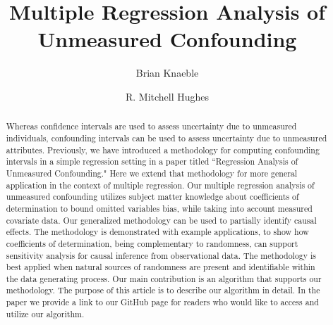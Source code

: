 \documentclass[11pt]{amsart}
\title{Multiple Regression Analysis of Unmeasured Confounding}
\author{Brian Knaeble}
\author{R. Mitchell Hughes}
\begin{document}
\begin{abstract}
Whereas confidence intervals are used to assess uncertainty due to unmeasured individuals, confounding intervals can be used to assess uncertainty due to unmeasured attributes. Previously, we have introduced a methodology for computing confounding intervals in a simple regression setting in a paper titled ``Regression Analysis of Unmeasured Confounding." Here we extend that methodology for more general application in the context of multiple regression. Our multiple regression analysis of unmeasured confounding utilizes subject matter knowledge about coefficients of determination to bound omitted variables bias, while taking into account measured covariate data. Our generalized methodology can be used to partially identify causal effects. The methodology is demonstrated with example applications, to show how coefficients of determination, being complementary to randomness, can support sensitivity analysis for causal inference from observational data. The methodology is best applied when natural sources of randomness are present and identifiable within the data generating process. Our main contribution is an algorithm that supports our methodology. The purpose of this article is to describe our algorithm in detail. In the paper we provide a link to our GitHub page for readers who would like to access and utilize our algorithm.
\end{abstract}

\maketitle
\end{document}

